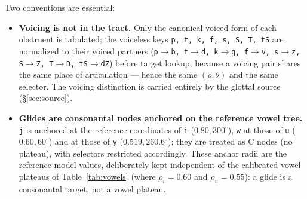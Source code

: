 \documentclass[11pt,a4paper]{article}
\newcommand{\turnh}{{\ipafont\symbol{"0265}}}
\begin{document}
Two conventions are essential:

\begin{itemize}[leftmargin=1.5em]
\item \textbf{Voicing is not in the tract.} Only the canonical voiced form
      of each obstruent is tabulated; the voiceless keys
      \texttt{p, t, k, f, s, S, T, tS} are normalized to their voiced
      partners (\texttt{p\(\to\)b, t\(\to\)d, k\(\to\)g, f\(\to\)v,
      s\(\to\)z, S\(\to\)Z, T\(\to\)D, tS\(\to\)dZ}) before target
      lookup, because a voicing pair shares the same place of
      articulation --- hence the same \((\rho,\theta)\) and the same
      selector. The voicing distinction is carried entirely by the glottal
      source (\S\ref{sec:source}).
\item \textbf{Glides are consonantal nodes anchored on the reference
      vowel tree.} \texttt{j} is anchored at the reference coordinates
      of \texttt{i} (\(0.80, 300^\circ\)),
      \texttt{w} at those of \texttt{u} (\(0.60, 60^\circ\)) and
      \texttt{\turnh} at those of \texttt{y} (\(0.519, 260.6^\circ\)); they are
      treated as C nodes (no plateau), with selectors restricted
      accordingly. These anchor radii are the reference-model values,
      deliberately kept independent of the calibrated vowel plateaus of
      Table~\ref{tab:vowels} (where \(\rho_i = 0.60\) and
      \(\rho_u = 0.55\)): a glide is a consonantal target, not a vowel
      plateau.
\end{itemize}
\end{document}
